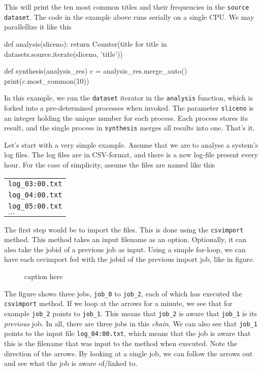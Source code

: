 \documentclass[a4paper]{article}
\begin{document}
\noindent This will print the ten most common titles and their
frequencies in the \texttt{source} \texttt{dataset}.  The code in the
example above runs serially on a single CPU.  We may parallellize it
like this
\begin{python}
def analysis(sliceno):
    return Counter(title for title in datasets.source.iterate(sliceno, 'title'))

def synthesis(analysis_res)
    c = analysis_res.merge_auto()
    print(c.most_common(10))
\end{python}

\noindent In this example, we run the \texttt{dataset} iterator in the
\texttt{analysis} function, which is forked into a pre-determined
processes when invoked.  The parameter \texttt{sliceno} is an integer
holding the unique number for each process.  Each process stores its
result, and the single process in \texttt{synthesis} merges all
results into one.  That's it.


\clearpage


Let's start with a very simple example.  Assume that we are to analyse
a system's log files.  The log files are in CSV-format, and there is a
new log-file present every hour.  For the case of simplicity, assume
the files are named like this

\begin{tabular}{l}
  \texttt{log\_03:00.txt}\\
  \texttt{log\_04:00.txt}\\
  \texttt{log\_05:00.txt}\\
  $\dots$
\end{tabular}

\noindent The first step would be to import the files.  This is done
using the \texttt{csvimport} method.  This method takes an input
filename as an option.  Optionally, it can also take the jobid of a
previous job as input.  Using a simple for-loop, we can have each
csvimport fed with the jobid of the previous import job, like in
figure.
\begin{figure}[h!]
  \begin{center}
    
    \caption{caption here}
    \label{figure:example}
  \end{center}
\end{figure}
The figure shows three jobs, \texttt{job\_0} to \texttt{job\_2}, each
of which has executed the \texttt{csvimport} method.  If we loop at
the arrows for a minute, we see that for example \texttt{job\_2}
points to \texttt{job\_1}.  This means that \texttt{job\_2} is aware
that \texttt{job\_1} is its \textsl{previous} job.  In all, there are
three jobs in this \textsl{chain}.  We can also see that
\texttt{job\_1} points to the input file \texttt{log\_04:00.txt},
which means that the job is aware that this is the filename that was
input to the method when executed.  Note the direction of the arrows.
By looking at a single job, we can follow the arrows out and see what
the job is aware of/linked to.
\end{document}
